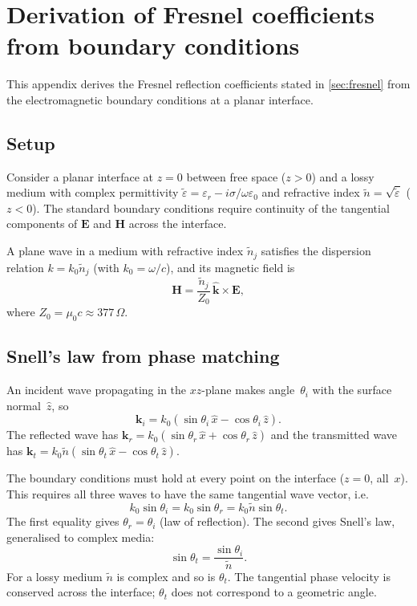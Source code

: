 \documentclass[11pt,a4paper]{article}
\theoremstyle{definition}      %
\newcommand{\khat}{\hat{\bm{k}}}
\newcommand{\EE}{\mathbf{E}}
\newcommand{\HH}{\mathbf{H}}
\newcommand{\ntilde}{\tilde{n}}
\begin{document}
\section{Derivation of Fresnel coefficients from boundary conditions}
\label{app:fresnel-derivation}

This appendix derives the Fresnel reflection coefficients stated in
\cref{sec:fresnel} from the electromagnetic boundary conditions at a
planar interface.

\subsection{Setup}
\label{app:fresnel-setup}

Consider a planar interface at $z=0$ between free space ($z>0$) and a
lossy medium with complex permittivity
$\tilde{\varepsilon}=\varepsilon_r-i\sigma/\omega\varepsilon_0$ and
refractive index $\ntilde=\sqrt{\tilde{\varepsilon}}$ ($z<0$).  The
standard boundary conditions require continuity of the tangential
components of $\EE$ and $\HH$ across the interface.

A plane wave in a medium with refractive index $\ntilde_j$ satisfies
the dispersion relation $k=k_0\ntilde_j$ (with
$k_0=\omega/c$), and its magnetic field is
\begin{equation}\label{eq:app-H-from-E}
  \HH = \frac{\ntilde_j}{Z_0}\,\khat\times\EE,
\end{equation}
where $Z_0=\mu_0 c\approx 377\,\Omega$.

\subsection{Snell's law from phase matching}
\label{app:snell}

An incident wave propagating in the $xz$-plane makes angle~$\theta_i$
with the surface normal~$\hat{z}$, so
\begin{equation}
  \mathbf{k}_i = k_0(\sin\theta_i\,\hat{x} - \cos\theta_i\,\hat{z}).
\end{equation}
The reflected wave has $\mathbf{k}_r = k_0(\sin\theta_r\,\hat{x}
+\cos\theta_r\,\hat{z})$ and the transmitted wave has
$\mathbf{k}_t = k_0\ntilde(\sin\theta_t\,\hat{x}
-\cos\theta_t\,\hat{z})$.

The boundary conditions must hold at every point on the interface
($z=0$, all~$x$).  This requires
all three waves to have the same tangential wave vector, i.e.
\begin{equation}
  k_0\sin\theta_i = k_0\sin\theta_r = k_0\ntilde\sin\theta_t.
\end{equation}
The first equality gives $\theta_r=\theta_i$ (law of reflection).
The second gives Snell's law, generalised to complex media:
\begin{equation}\label{eq:app-snell}
  \boxed{\sin\theta_t = \frac{\sin\theta_i}{\ntilde}.}
\end{equation}
For a lossy medium $\ntilde$ is complex and so is $\theta_t$.  The
tangential phase velocity is conserved across the interface;
$\theta_t$ does not correspond to a geometric angle.
\end{document}

